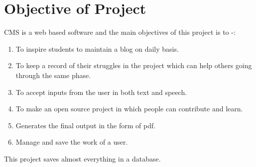 \section{Objective of Project}
CMS is a web based software and the 
main objectives of this project is to -:
\begin{enumerate}
\item To inspire students to maintain a blog on daily basis. 
\item To keep a record of their struggles in the project which can help others going through the same phase.
\item To accept inputs from the user in both text and speech.
\item To make an open source project in which people can contribute and learn.
\item Generates the final output in the form of pdf.
\item Manage and save the work of a user.
\end{enumerate}
This project saves almost everything in a database.

